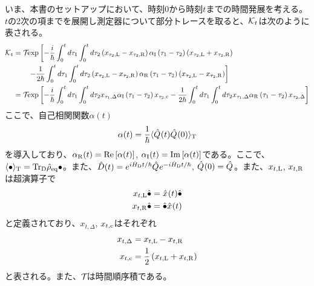 \documentclass[10pt, a4paper]{jsarticle}
\begin{document}
いま、本書のセットアップにおいて、時刻$0$から時刻$t$までの時間発展を考える。$t$の2次の項までを展開し測定器について部分トレースを取ると、$\sop{K}{t}$は次のように表される。
\begin{equation}
\begin{split}
\label{eq:27}
	\sop{K}{t} &= \sop{T}{} {\rm exp} \left[ - \dfrac{i}{\hbar} \integ{0}{t} d\tau_{1} \integ{0}{t} d\tau_{2}  \left(x_{\tau_{2}, {\rm L}} - x_{\tau_{2}, {\rm R}}\right) \alpha_{\rm I} \left(\tau_{1} - \tau_{2} \right) \left(x_{\tau_{2}, {\rm L}} + x_{\tau_{2}, {\rm R}}\right) \right. \\
		&\qquad \left. - \dfrac{1}{2 \hbar} \integ{0}{t} d\tau_{1} \integ{0}{t} d\tau_{2}  \left(x_{\tau_{2}, {\rm L}} - x_{\tau_{2}, {\rm R}}\right) \alpha_{\rm R} \left(\tau_{1} - \tau_{2} \right) \left(x_{\tau_{2}, {\rm L}} - x_{\tau_{2}, {\rm R}}\right) \right] \\
		&= \sop{T}{} \exp{- \dfrac{i}{\hbar} \integ{0}{t} d\tau_{1} \integ{0}{t} d\tau_{2}  x_{\tau_{1}, \Delta} \alpha_{\rm I} \left(\tau_{1} - \tau_{2} \right) x_{\tau_{2}, {\rm c}} - \dfrac{1}{2 \hbar} \integ{0}{t} d\tau_{1} \integ{0}{t} d\tau_{2}  x_{\tau_{1}, \Delta} \alpha_{\rm R} \left(\tau_{1} - \tau_{2} \right) x_{\tau_{2}, \Delta}}
\end{split}
\end{equation}
ここで、自己相関関数$\alpha(t)$
\begin{equation}
\begin{split}
\label{eq:28}
	\alpha(t) = \dfrac{1}{\hbar} \expect{\op{Q}{}(t) \op{Q}{}(0)}{T}
\end{split}
\end{equation}
を導入しており、$\alpha_{\rm R}(t) = \Re{\alpha(t)}$, $\alpha_{\rm I}(t) = \Im{\alpha(t)}$である。ここで、$\expect{\bullet}{T} = \Tr{D}{\hrho{eq} \bullet}$。また、$\hat{D}(t) = \e{i \H{D} t / \hbar} \op{Q}{} \e{- i \H{D} t / \hbar}$, $\op{Q}{}(0) = \op{Q}{}$。また、$x_{t, {\rm L}}$, $x_{t, {\rm R}}$は超演算子で
\begin{equation}
\begin{split}
\label{eq:29}
	x_{t, {\rm L}} \hdot &= \op{x}{}(t) \hdot \\
	x_{t, {\rm R}} \hdot &= \hdot \op{x}{}(t)
\end{split}
\end{equation}
と定義されており、$x_{t, \Delta}$, $x_{t, {\rm c}}$はそれぞれ
\begin{equation}
\begin{split}
\label{eq:210}
	x_{t, \Delta} &= x_{t, {\rm L}} - x_{t, {\rm R}} \\
	x_{t, {\rm c}} &= \dfrac{1}{2} \left( x_{t, {\rm L}} + x_{t, {\rm R}} \right) \\
\end{split}
\end{equation}
と表される。また、$\sop{T}{}$は時間順序積である。
\end{document}

